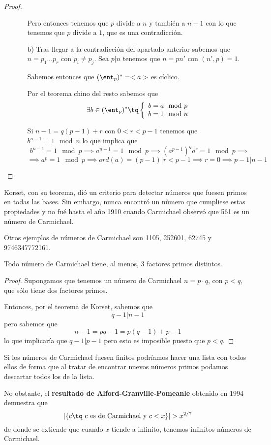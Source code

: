 \begin{proof}
\begin{itemize}
\begin{itemize}
Pero entonces tenemos que $p$ divide a $n$ y también a $n-1$ con lo que tenemos que $p$ divide a $1$, que es una contradicción.

\item[b)]
Tras llegar a la contradicción del apartado anterior sabemos que $n=p_1...p_r$ con $p_i \neq p_j$. Sea $p | n$ tenemos que $n=pn'$ con $(n',p)=1$.

Sabemos entonces que $(\ent_p)^*=<a>$ es cíclico.

Por el teorema chino del resto sabemos que 
\[\exists b \in (\ent_p)^* \tq \left\{\begin{array}{l}b=a\mod p \\ b=1 \mod n \end{array}\right.\] 

Si $n-1 = q(p-1)+r$ con $0 < r < p-1$ tenemos que $b^{n-1}=1 \mod n$ lo que implica que
\[b^{n-1}=1 \mod p \implies a^{n-1} = 1 \mod p \implies (a^{p-1})^qa^r = 1 \mod p \implies\]
\[\implies a^p = 1 \mod p \implies ord(a) = (p-1)|r<p-1 \implies r=0\implies p-1 | n-1\]
\end{itemize}
\end{itemize}
\end{proof}

Korset, con su teorema, dió un criterio para detectar números que fuesen primos en todas las bases. Sin embargo, nunca encontró un número que cumpliese estas propiedades y no fué hasta el año 1910 cuando Carmichael observó que 561 es un número de Carmichael.

Otros ejemplos de números de Carmichael son 1105, 252601, 62745 y 9746347772161.

\begin{prop}
Todo número de Carmichael tiene, al menos, 3 factores primos distintos.
\end{prop}
\begin{proof}
Supongamos que tenemos un número de Carmichael $n=p\cdot q$, con $p<q$, que sólo tiene dos factores primos.

Entonces, por el teorema de Korset, sabemos que 
\[q-1 | n-1\]
pero sabemos que 
\[n-1 =pq-1=p(q-1)+p-1\]
lo que implicaría que $q-1|p-1$ pero esto es imposible puesto que $p<q$.
\end{proof}

Si los números de Carmichael fuesen finitos podríamos hacer una lista con todos ellos de forma que al tratar de encontrar nuevos números primos podamos descartar todos los de la lista.

No obstante, el \textbf{resultado de Alford-Granville-Pomeanle} obtenido en 1994 demuestra que 
\[|\{c \tq \text{ c es de Carmichael y } c < x\}| > x^{2/7}\]
de donde se extiende que cuando $x$ tiende a infinito, tenemos infinitos números de Carmichael.

